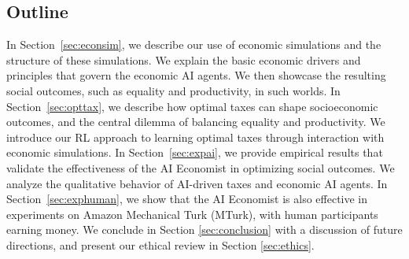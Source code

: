 \subsection{Outline}


In Section~\ref{sec:econsim}, we describe our use of economic simulations and the structure of these simulations. We explain the basic economic drivers and principles that govern the economic AI agents. We then showcase the resulting social outcomes, such as equality and productivity, in such worlds.
In Section~\ref{sec:opttax}, we describe how optimal taxes can shape socioeconomic outcomes, and the central dilemma of balancing equality and productivity. We introduce our RL approach to learning optimal taxes through interaction with economic simulations.
In Section~\ref{sec:expai}, we provide empirical results that validate the effectiveness of the AI Economist in optimizing social outcomes. We analyze the qualitative behavior of AI-driven taxes and economic AI agents.
In Section~\ref{sec:exphuman}, we show that the AI Economist is also effective in experiments on Amazon Mechanical Turk (MTurk), with human participants earning  money.
We conclude in Section \ref{sec:conclusion} with a discussion of future directions, and present our ethical review in Section \ref{sec:ethics}.
